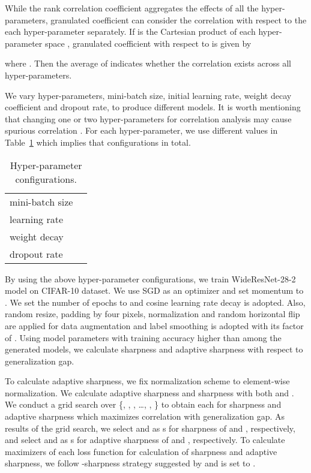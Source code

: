 \documentclass{article}
\begin{document}
While the rank correlation coefficient aggregates the effects of all the hyper-parameters, granulated coefficient \cite{jiang2019fantastic} can consider the correlation with respect to the each hyper-parameter separately. If  is the Cartesian product of each hyper-parameter space , granulated coefficient with respect to  is given by

where . Then the average  of  indicates whether the correlation exists across all hyper-parameters.

We vary  hyper-parameters, mini-batch size, initial learning rate, weight decay coefficient and dropout rate, to produce different models. It is worth mentioning that changing one or two hyper-parameters for correlation analysis may cause spurious correlation \cite{jiang2019fantastic}. For each hyper-parameter, we use  different values in Table~\ref{hyper} which implies that  configurations in total.

\begin{table}[h]
\centering
\captionsetup{justification=centering}
\caption{Hyper-parameter configurations. \label{hyper}}
\begin{center}
\begin{small}
\begin{tabular}{lc}
\toprule
mini-batch size & \\
learning rate & \\
weight decay & \\
dropout rate & \\
\bottomrule
\end{tabular}
\end{small}
\end{center}
\end{table}

By using the above hyper-parameter configurations, we train WideResNet-28-2 model on CIFAR-10 dataset. We use SGD as an optimizer and set momentum to . We set the number of epochs to  and cosine learning rate decay \citep{loshchilov2016sgdr} is adopted. Also, random resize, padding by four pixels, normalization and random horizontal flip are applied for data augmentation and label smoothing \citep{NEURIPS2019_f1748d6b} is adopted with its factor of . 
Using model parameters with training accuracy higher than  among the generated models, we calculate sharpness and adaptive sharpness with respect to generalization gap. 

To calculate adaptive sharpness, we fix normalization scheme to element-wise normalization. We calculate adaptive sharpness and sharpness with both  and . We conduct a grid search over \{, , , \ldots, , \} to obtain each  for sharpness and adaptive sharpness which maximizes correlation with generalization gap. As results of the grid search, we select  and  as s for sharpness of  and , respectively, and select  and  as s for adaptive sharpness of  and , respectively. To calculate maximizers of each loss function for calculation of sharpness and adaptive sharpness, we follow -sharpness strategy suggested by \citet{foret2021sharpnessaware} and  is set to .
\end{document}
